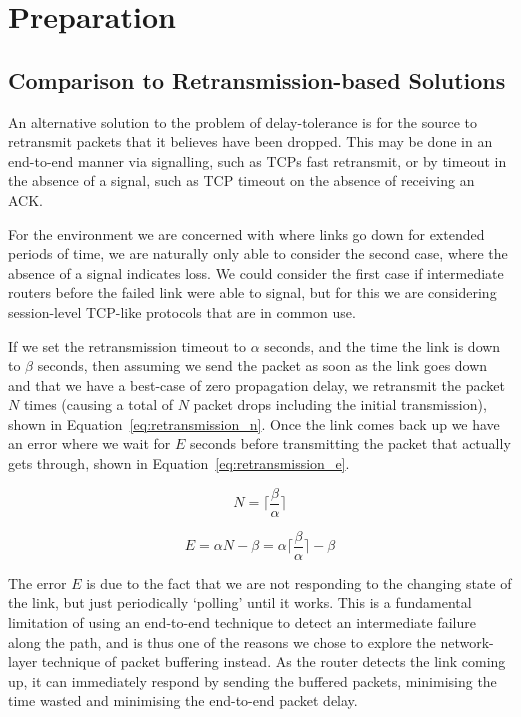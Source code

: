 \documentclass[withindex,glossary,openany]{cam-thesis}
\begin{document}
\chapter{Preparation}

\section{Comparison to Retransmission-based Solutions}
\label{sec:retransmission}

An alternative solution to the problem of delay-tolerance  is for the source to retransmit packets that it believes have been dropped. This may be done in an end-to-end manner via signalling, such as TCPs fast retransmit, or by timeout in the absence of a signal, such as TCP timeout on the absence of receiving an ACK.

For the environment we are concerned with where links go down for extended periods of time, we are naturally only able to consider the second case, where the absence of a signal indicates loss. We could consider the first case if intermediate routers before the failed link were able to signal, but for this we are considering session-level TCP-like protocols that are in common use.

If we set the retransmission timeout to $\alpha$ seconds, and the time the link is down to $\beta$ seconds, then assuming we send the packet as soon as the link goes down and that we have a best-case of zero propagation delay, we retransmit the packet $N$ times (causing a total of $N$ packet drops including the initial transmission), shown in Equation~\ref{eq:retransmission_n}. Once the link comes back up we have an error where we wait for $E$ seconds before transmitting the packet that actually gets through, shown in Equation~\ref{eq:retransmission_e}.

\begin{minipage}{0.35\textwidth}
\begin{equation} \label{eq:retransmission_n}
N = \Big\lceil\frac{\beta}{\alpha}\Big\rceil
\end{equation}
\end{minipage}%
\begin{minipage}{0.65\textwidth}
\begin{equation} \label{eq:retransmission_e}
E = \alpha N - \beta = \alpha \Big\lceil\frac{\beta}{\alpha}\Big\rceil - \beta
\end{equation}
\end{minipage}

The error $E$ is due to the fact that we are not responding to the changing state of the link, but just periodically `polling' until it works. This is a fundamental limitation of using an end-to-end technique to detect an intermediate failure along the path, and is thus one of the reasons we chose to explore the network-layer technique of packet buffering instead. As the router detects the link coming up, it can immediately respond by sending the buffered packets, minimising the time wasted and minimising the end-to-end packet delay.
\end{document}
